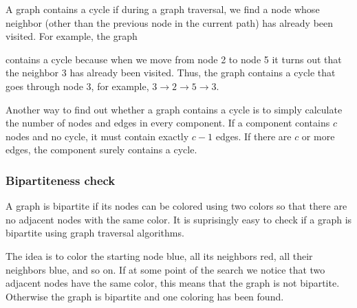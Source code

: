 A graph contains a cycle if during a graph traversal,
we find a node whose neighbor (other than the
previous node in the current path) has already been
visited.
For example, the graph
\begin{center}
\end{center}
contains a cycle because when we move from
node 2 to node 5 it turns out
that the neighbor 3 has already been visited.
Thus, the graph contains a cycle that goes through node 3,
for example, $3 \rightarrow 2 \rightarrow 5 \rightarrow 3$.

Another way to find out whether a graph contains a cycle
is to simply calculate the number of nodes and edges
in every component.
If a component contains $c$ nodes and no cycle,
it must contain exactly $c-1$ edges.
If there are $c$ or more edges, the component
surely contains a cycle.

\subsubsection{Bipartiteness check}


A graph is bipartite if its nodes can be colored
using two colors so that there are no adjacent
nodes with the same color.
It is suprisingly easy to check if a graph
is bipartite using graph traversal algorithms.

The idea is to color the starting node blue,
all its neighbors red, all their neighbors blue, and so on.
If at some point of the search we notice that
two adjacent nodes have the same color,
this means that the graph is not bipartite.
Otherwise the graph is bipartite and one coloring
has been found.

